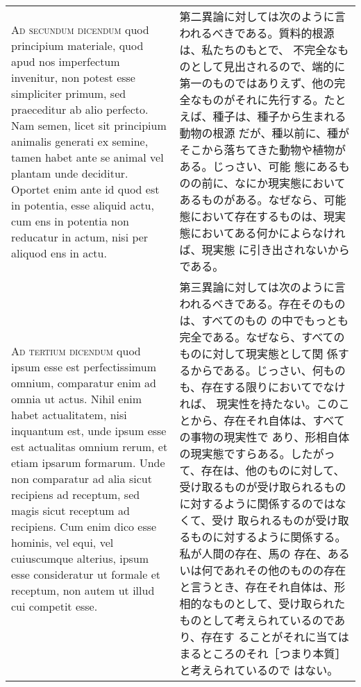 \documentclass[10pt]{jsarticle} %
\begin{document}
\begin{longtable}{p{21em}p{21em}}
\\

{\scshape Ad secundum dicendum} quod principium materiale, quod apud nos
 imperfectum invenitur, non potest esse simpliciter primum, sed
 praeceditur ab alio perfecto. Nam semen, licet sit principium animalis
 generati ex semine, tamen habet ante se animal vel plantam unde
 deciditur. Oportet enim ante id quod est in potentia, esse aliquid
 actu, cum ens in potentia non reducatur in actum, nisi per aliquod ens
 in actu.
&

第二異論に対しては次のように言われるべきである。質料的根源は、私たちのもとで、
 不完全なものとして見出されるので、端的に第一のものではありえず、他の完
 全なものがそれに先行する。たとえば、種子は、種子から生まれる動物の根源
 だが、種以前に、種がそこから落ちてきた動物や植物がある。じっさい、可能
 態にあるものの前に、なにか現実態においてあるものがある。なぜなら、可能
 態において存在するものは、現実態においてある何かによらなければ、現実態
 に引き出されないからである。


\\

{\scshape Ad tertium dicendum} quod ipsum esse est perfectissimum
 omnium, comparatur enim ad omnia ut actus. Nihil enim habet
 actualitatem, nisi inquantum est, unde ipsum esse est actualitas omnium
 rerum, et etiam ipsarum formarum. Unde non comparatur ad alia sicut
 recipiens ad receptum, sed magis sicut receptum ad recipiens. Cum enim
 dico esse hominis, vel equi, vel cuiuscumque alterius, ipsum esse
 consideratur ut formale et receptum, non autem ut illud cui competit
 esse.

&

第三異論に対しては次のように言われるべきである。存在そのものは、すべてのもの
 の中でもっとも完全である。なぜなら、すべてのものに対して現実態として関
 係するからである。じっさい、何ものも、存在する限りにおいてでなければ、
 現実性を持たない。このことから、存在それ自体は、すべての事物の現実性で
 あり、形相自体の現実態ですらある。したがって、存在は、他のものに対して、
 受け取るものが受け取られるものに対するように関係するのではなくて、受け
 取られるものが受け取るものに対するように関係する。私が人間の存在、馬の
 存在、あるいは何であれその他のものの存在と言うとき、存在それ自体は、形
 相的なものとして、受け取られたものとして考えられているのであり、存在す
 ることがそれに当てはまるところのそれ［つまり本質］と考えられているので
 はない。

\end{longtable}


\newpage
{}
\end{document}
